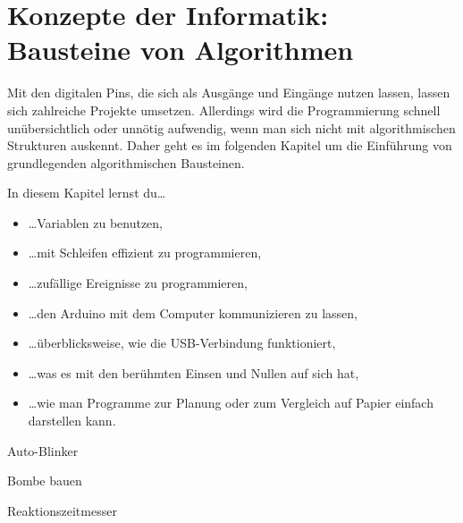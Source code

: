 \chapter{Konzepte der Informatik: Bausteine von Algorithmen}

Mit den digitalen Pins, die sich als Ausgänge und Eingänge nutzen lassen, lassen sich zahlreiche Projekte umsetzen. Allerdings wird die Programmierung schnell unübersichtlich oder unnötig aufwendig, wenn man sich nicht mit algorithmischen Strukturen auskennt. Daher geht es im folgenden Kapitel um die Einführung von grundlegenden algorithmischen Bausteinen.

\bigskip
In diesem Kapitel lernst du\dots
\begin{itemize}
	\item \dots Variablen zu benutzen,
	\item \dots mit Schleifen effizient zu programmieren,
	\item \dots zufällige Ereignisse zu programmieren,
	\item \dots den Arduino mit dem Computer kommunizieren zu lassen,
	\item \dots überblicksweise, wie die USB-Verbindung funktioniert,
	\item \dots was es mit den berühmten Einsen und Nullen auf sich hat,
	\item \dots wie man Programme zur Planung oder zum Vergleich auf Papier einfach darstellen kann.
\end{itemize}

\bigskip

\begin{projektueberblick}
	\item Auto-Blinker \dotfill \pageref{proj:blinker}
	\item Bombe bauen \dotfill \pageref{proj:bombe}
	\item Reaktionszeitmesser \dotfill \pageref{proj:reaktionszeitmesser}
\end{projektueberblick}

\newpage
